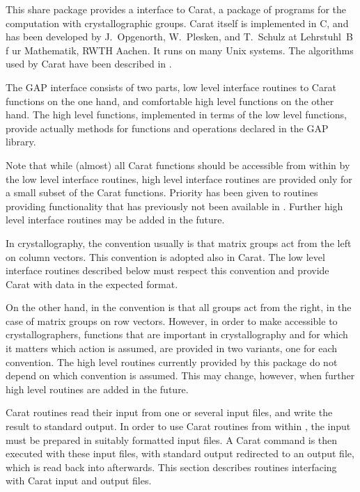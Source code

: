 
This share package provides a {\GAP} interface to Carat, 
a package of programs for the computation with crystallographic 
groups. Carat itself is implemented in C, and has been developed
by J.~Opgenorth, W.~Plesken, and T.~Schulz at Lehrstuhl~B 
f{ u}r Mathematik, RWTH Aachen. It runs on many Unix 
systems. The algorithms used by Carat have been described in
\cite{OPS98}.

The {GAP} interface consists of two parts, low level interface 
routines to Carat functions on the one hand, and comfortable high 
level {\GAP} functions on the other hand. The high level functions,
implemented in terms of the low level functions, provide actually
methods for functions and operations declared in the {GAP} library.

Note that while (almost) all Carat functions should be accessible
from within {\GAP} by the low level interface routines, high level
interface routines are provided only for a small subset of the
Carat functions. Priority has been given to routines providing
functionality that has previously not been available in {\GAP}.
Further high level interface routines may be added in the future.


In crystallography, the convention usually is that matrix groups
act from the left on column vectors. This convention is adopted
also in Carat. The low level interface routines described below
must respect this convention and provide Carat with data in the 
expected format.

On the other hand, in {\GAP} the convention is that all groups 
act from the right, in the case of matrix groups on row vectors. 
However, in order to make {\GAP} accessible to crystallographers,
functions that are important in crystallography and for which it
matters which action is assumed, are provided in two variants, 
one for each convention. The high level routines currently provided
by this package do not depend on which convention is assumed.
This may change, however, when further high level routines are 
added in the future.


Carat routines read their input from one or several input files,
and write the result to standard output. In order to use Carat
routines from within {\GAP}, the input must be prepared in suitably
formatted input files. A Carat command is then executed with these
input files, with standard output redirected to an output file, 
which is read back into {\GAP} afterwards. This section describes
routines interfacing with Carat input and output files.

